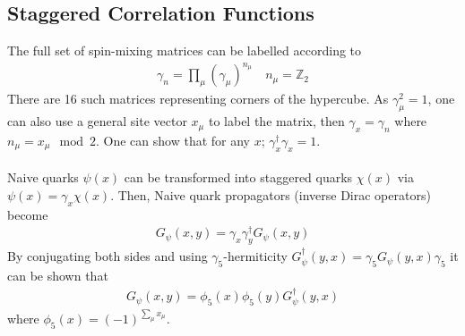\subsection{Staggered Correlation Functions}

{}


The full set of spin-mixing matrices can be labelled according to
\begin{align}
	\gamma_n = \prod_{\mu} \left( \gamma_{\mu} \right)^{n_{\mu}} \quad n_{\mu} = \mathbb{Z}_2
\end{align}
There are 16 such matrices representing corners of the hypercube. As $\gamma_{\mu}^2=1$, one can also use a general site vector $x_{\mu}$ to label the matrix, then $\gamma_x = \gamma_n$ where $n_{\mu} = x_{\mu} \mod 2$. One can show that for any $x$; $\gamma_x^{\dagger} \gamma_x = 1$.
\\ \\
Naive quarks $\psi(x)$ can be transformed into staggered quarks $\chi(x)$ via $\psi(x) = \gamma_x \chi(x)$. Then, Naive quark propagators (inverse Dirac operators) become
\begin{align}
	G_{\psi}(x,y) = \gamma_x\gamma^{\dagger}_y G_{\psi}(x,y)
\end{align}
By conjugating both sides and using $\gamma_5$-hermiticity $G^{\dagger}_{\psi}(y,x) = \gamma_5 G_{\psi}(y,x)\gamma_5$ it can be shown that
\begin{align}
	\label{eq:Gconj}
	G_{\psi}(x,y) = \phi_5(x)\phi_5(y) G^{\dagger}_{\psi}(y,x)
\end{align}
where $\phi_5(x) = (-1)^{\sum_{\mu} x_{\mu}}$.

